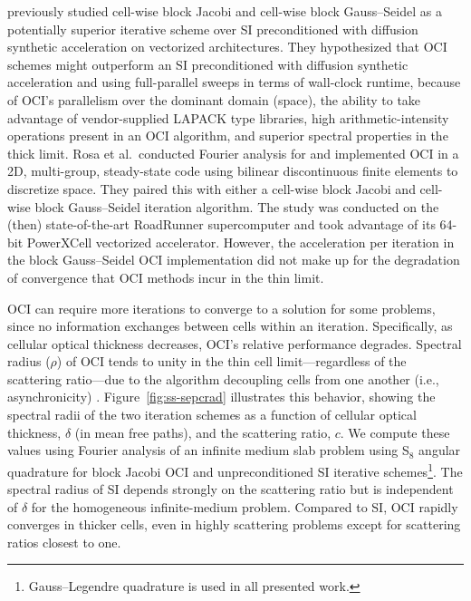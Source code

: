 \cite{rosa_cellwise_2013} previously studied cell-wise block Jacobi and cell-wise block Gauss--Seidel as a potentially superior iterative scheme over SI preconditioned with diffusion synthetic acceleration on vectorized architectures.
They hypothesized that OCI schemes might outperform an SI preconditioned with diffusion synthetic acceleration and using full-parallel sweeps in terms of wall-clock runtime, because of OCI's parallelism over the dominant domain (space), the ability to take advantage of vendor-supplied LAPACK type libraries, high arithmetic-intensity operations present in an OCI algorithm, and superior spectral properties in the thick limit.
Rosa et al.\ conducted Fourier analysis for and implemented OCI in a 2D, multi-group, steady-state code using bilinear discontinuous finite elements to discretize space.
They paired this with either a cell-wise block Jacobi and cell-wise block Gauss--Seidel iteration algorithm.
The study was conducted on the (then) state-of-the-art RoadRunner supercomputer and took advantage of its 64-bit PowerXCell vectorized accelerator.
However, the acceleration per iteration in the block Gauss--Seidel OCI implementation did not make up for the degradation of convergence that OCI methods incur in the thin limit.

OCI can require more iterations to converge to a solution for some problems, since no information exchanges between cells within an iteration.
Specifically, as cellular optical thickness decreases, OCI's relative performance degrades.
Spectral radius ($\rho$) of OCI tends to unity in the thin cell limit---regardless of the scattering ratio---due to the algorithm decoupling cells from one another (i.e., asynchronicity) \cite{rosa_cellwise_2013, hoagland_hybrid_2021, man1994parallel}. 
Figure~\ref{fig:ss-sepcrad} illustrates this behavior, showing the spectral radii of the two iteration schemes as a function of cellular optical thickness, $\delta$ (in mean free paths), and the scattering ratio, $c$.
We compute these values using Fourier analysis of an infinite medium slab problem using S$_{8}$ angular quadrature for block Jacobi OCI and unpreconditioned SI iterative schemes\footnote{Gauss--Legendre quadrature is used in all presented work.}.
The spectral radius of SI depends strongly on the scattering ratio but is independent of $\delta$ for the homogeneous infinite-medium problem. 
Compared to SI, OCI rapidly converges in thicker cells, even in highly scattering problems except for scattering ratios closest to one.

